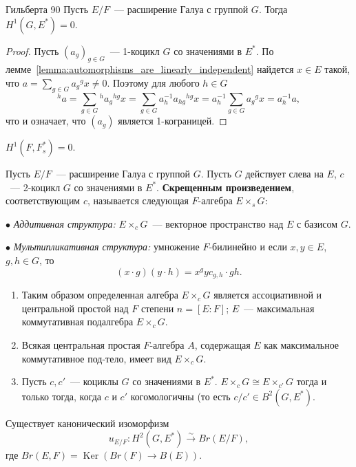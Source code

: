 \documentclass[a4paper,oneside,12pt]{article}
\theoremstyle{plain} { \swapnumbers
\newtheorem{theorem}{Теорема}[subsection]
\newtheorem{corollary}[theorem]{Следствие}
\newtheorem{lemma}[theorem]{Лемма}
\newtheorem{proposition}[theorem]{Утверждение}
\newtheorem{claim}[theorem]{Факт}
}
\theoremstyle{definition} { \swapnumbers
\newtheorem{definition}[theorem]{Определение}
\newtheorem{notation}[theorem]{Обозначение}
\newtheorem{remark}[theorem]{Замечание}
\newtheorem{remarks}[theorem]{Замечания}
\newtheorem{example}[theorem]{Пример}
\newtheorem{examples}[theorem]{Примеры}
\newtheorem{sssection}[theorem]{}
}
\def\Ker{\operatorname{Ker}}
\begin{document}
\begin{theorem}{Гильберта 90}
Пусть $E/F$~--- расширение Галуа с группой $G$. Тогда $H^1(G,E^*)=0$.
\end{theorem}
\begin{proof}
Пусть $(a_g)_{g\in G}$~--- 1-коцикл $G$ со значениями в $E^*$.
По лемме~\ref{lemma:automorphisms_are_linearly_independent} найдется $x\in E$
такой, что $a=\sum_{g\in G}a_g{}^gx\neq 0$. Поэтому для любого $h\in G$
$$
{}^ha=\sum_{g\in G}{}^ha_g{}^{hg}x=\sum_{g\in G}a_h^{-1}a_{hg}{}^{hg}x= a_h^{-1}\sum_{g\in G}a_g{}^gx=a_h^{-1}a,
$$
что и означает, что $(a_g)$ является 1-кограницей.
\end{proof}
\begin{corollary}
$H^1(F,F^*_s)=0$.
\end{corollary}


\begin{definition}
Пусть $E/F$~--- расширение Галуа с группой $G$. Пусть $G$ действует слева на $E$,
$c$~--- 2-коцикл $G$ со значениями в $E^*$. {\bf Скрещенным произведением},
соответствующим $c$, называется следующая $F$-алгебра $E\times_sG$:
\par\noindent$\bullet$ {\it Аддитивная структура:} $E\times_cG$~--- векторное пространство над $E$
с базисом $G$.
\par\noindent$\bullet$ {\it Мультипликативная структура:} умножение $F$-билинейно и если
$x,y\in E$, $g,h\in G$, то
$$
(x\cdot g)(y\cdot h)=x{}^gyc_{g,h}\cdot gh.
$$
\end{definition}

\begin{theorem}
\begin{enumerate}
\item Таким образом определенная алгебра $E\times_cG$ является ассоциативной и центральной простой над $F$
степени $n=[E:F]$; $E$~--- максимальная коммутативная подалгебра $E\times_cG$.
\item Всякая центральная простая $F$-алгебра $A$, содержащая $E$ как максимальное коммутативное под-тело,
имеет вид $E\times_cG$.
\item Пусть $c,c'$~--- коциклы $G$ со значениями в $E^*$. $E\times_cG\cong E\times_{c'}G$ тогда и только тогда,
когда $c$ и $c'$ когомологичны (то есть $c/c'\in B^2(G,E^*)$.
\end{enumerate}
\end{theorem}

\begin{corollary}\label{corollary:secong_cohomology_as_brauer_group}
Существует канонический изоморфизм
$$
u_{E/F}\colon H^2(G,E^*)\stackrel{\sim}{\to} Br(E/F),
$$
где $Br(E,F)=\Ker(Br(F)\to B(E))$.
\end{corollary}
\end{document}
